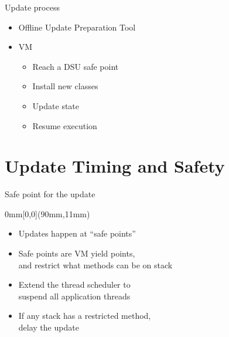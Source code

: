 


\begin{frame}[t,fragile]{Update process}%
\begin{itemize}
\item Offline Update Preparation Tool
\item \DSU{} VM
  \begin{itemize}
  \item Reach a DSU safe point
  \item Install new classes
  \item Update state
  \item Resume execution
  \end{itemize}
\end{itemize}
\end{frame}

\section{Update Timing and Safety}


\begin{frame}[t,label=suspend]{Safe point for the update}%
\begin{textblock*}{0mm}[0,0](90mm,11mm)%
%
%
\end{textblock*}%
\begin{itemize}%
\item Updates happen at ``safe points''
\item Safe points are VM yield points, \\
      and restrict what methods can be on stack
\item<3> Extend the thread scheduler to \\
      suspend all application threads
\item<3> If any stack has a restricted method, \\
      delay the update
\end{itemize}%
\end{frame}

